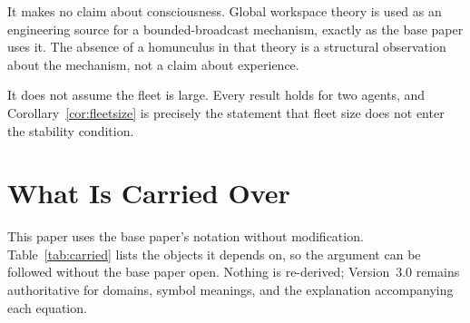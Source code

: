 \documentclass[11pt]{article}
\begin{document}
It makes no claim about consciousness. Global workspace theory is used as an engineering source for a bounded-broadcast mechanism, exactly as the base paper uses it. The absence of a homunculus in that theory is a structural observation about the mechanism, not a claim about experience.

It does not assume the fleet is large. Every result holds for two agents, and Corollary~\ref{cor:fleetsize} is precisely the statement that fleet size does not enter the stability condition.

\section{What Is Carried Over}
\label{sec:carried}

This paper uses the base paper's notation without modification. Table~\ref{tab:carried} lists the objects it depends on, so the argument can be followed without the base paper open. Nothing is re-derived; Version~3.0 remains authoritative for domains, symbol meanings, and the explanation accompanying each equation.
\end{document}
